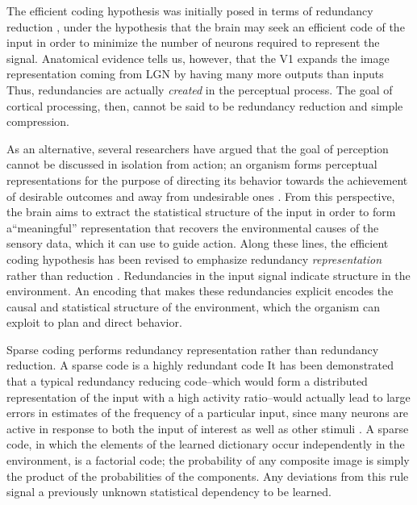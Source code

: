 The efficient coding hypothesis was initially posed in terms of redundancy reduction \parencite{barlow1961possible}, under the hypothesis that the brain may seek an efficient code of the input in order to minimize the number of neurons required to represent the signal. Anatomical evidence tells us, however, that the V1 expands the image representation coming from LGN by having many more outputs than inputs \parencite{olshausen2003principles} Thus, redundancies are actually \textit{created} in the perceptual process. The goal of cortical processing, then, cannot be said to be redundancy reduction and simple compression.

As an alternative, several researchers have argued that the goal of perception cannot be discussed in isolation from action; an organism forms perceptual representations for the purpose of directing its behavior towards the achievement of desirable outcomes and away from undesirable ones \parencite{barlow2001redundancy, simoncelli2001natural}. From this perspective, the brain aims to extract the statistical structure of the input in order to form a``meaningful'' representation that recovers the environmental causes of the sensory data, which it can use to guide action. Along these lines, the efficient coding hypothesis has been revised to emphasize redundancy \textit{representation} rather than reduction \parencite{barlow2001redundancy}. Redundancies in the input signal indicate structure in the environment. An encoding that makes these redundancies explicit encodes the causal and statistical structure of the environment, which the organism can exploit to plan and direct behavior.

Sparse coding performs redundancy representation rather than redundancy reduction. A sparse code is a highly redundant code It has been demonstrated that a typical redundancy reducing code--which would form a distributed representation of the input with a high activity ratio--would actually lead to large errors in estimates of the frequency of a particular input, since many neurons are active in response to both the input of interest as well as other stimuli \parencite{gardnermedwin2001limits}. A sparse code, in which the elements of the learned dictionary occur independently in the environment, is a factorial code; the probability of any composite image is simply the product of the probabilities of the components. Any deviations from this rule signal a previously unknown statistical dependency to be learned.

